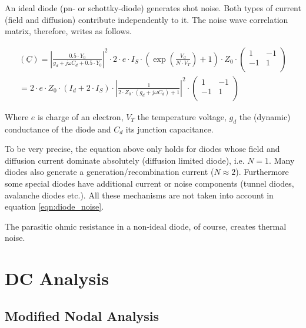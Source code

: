 \documentclass[10pt]{report}
\begin{document}
An ideal diode (pn- or schottky-diode) generates shot noise.  Both
types of current (field and diffusion) contribute independently to it.
The noise wave correlation matrix, therefore, writes as follows.

\begin{equation}
\begin{split}
(\underline{C})
 =  \left| \frac{0.5\cdot Y_0}{g_d+j\omega C_d + 0.5\cdot Y_0}\right|^2  \cdot 2\cdot e\cdot I_S\cdot
    \left( \exp\left( \frac{V_{d}}{N\cdot V_T} \right) +1 \right) \cdot Z_0\cdot\begin{pmatrix}
   1 & -1\\
  -1 &  1\\
\end{pmatrix} \\
 = 2\cdot e\cdot Z_0\cdot \left(I_{d} + 2\cdot I_{S}\right)\cdot
    \left| \frac{1}{2\cdot Z_0\cdot (g_d+j\omega C_d) + 1}\right|^2 \cdot
\begin{pmatrix}
   1 & -1\\
  -1 &  1\\
\end{pmatrix}
\end{split}
\label{eqn:diode_noise}
\end{equation}

Where $e$ is charge of an electron, $V_T$ the temperature voltage,
$g_d$ the (dynamic) conductance of the diode and $C_d$ its junction
capacitance.

\addvspace{12pt}

To be very precise, the equation above only holds for diodes whose
field and diffusion current dominate absolutely (diffusion limited
diode), i.e. $N=1$.  Many diodes also generate a
generation/recombination current ($N\approx 2$).  Furthermore some
special diodes have additional current or noise components (tunnel
diodes, avalanche diodes etc.).  All these mechanisms are not taken
into account in equation \eqref{eqn:diode_noise}.

\addvspace{12pt}

The parasitic ohmic resistance in a non-ideal diode, of course,
creates thermal noise.

\chapter{DC Analysis}

\section{Modified Nodal Analysis}
\end{document}
